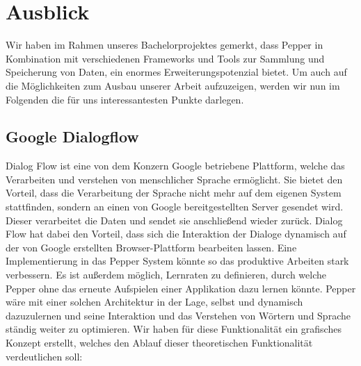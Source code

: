 \newcommand{\ausblickchapter}{Kapitel 9. }
\chapter{Ausblick}
\label{chapter:ausblick}
\lhead{\ausblickchapter \emph{Ausblick}}



Wir haben im Rahmen unseres Bachelorprojektes gemerkt, dass Pepper in Kombination mit verschiedenen Frameworks und Tools zur Sammlung und Speicherung von Daten, ein enormes Erweiterungspotenzial bietet. Um auch auf die Möglichkeiten zum Ausbau unserer Arbeit aufzuzeigen, werden wir nun im Folgenden die für uns interessantesten Punkte darlegen.
\\
\section{Google Dialogflow}

Dialog Flow ist eine von dem Konzern Google betriebene Plattform, welche das Verarbeiten und verstehen von menschlicher Sprache ermöglicht. Sie bietet den Vorteil, dass die Verarbeitung der Sprache nicht mehr auf dem eigenen System stattfinden, sondern an einen von Google bereitgestellten Server gesendet wird. Dieser verarbeitet die Daten und sendet sie anschließend wieder zurück. Dialog Flow hat dabei den Vorteil, dass sich die Interaktion der Dialoge dynamisch auf der von Google erstellten Browser-Plattform bearbeiten lassen. Eine Implementierung in das Pepper System könnte so das produktive Arbeiten stark verbessern. Es ist außerdem möglich, Lernraten zu definieren, durch welche Pepper ohne das erneute Aufspielen einer Applikation dazu lernen könnte. Pepper wäre mit einer solchen Architektur in der Lage, selbst und dynamisch dazuzulernen und seine Interaktion und das Verstehen von Wörtern und Sprache ständig weiter zu optimieren. Wir haben für diese Funktionalität ein grafisches Konzept erstellt, welches den Ablauf dieser theoretischen Funktionalität verdeutlichen soll:

